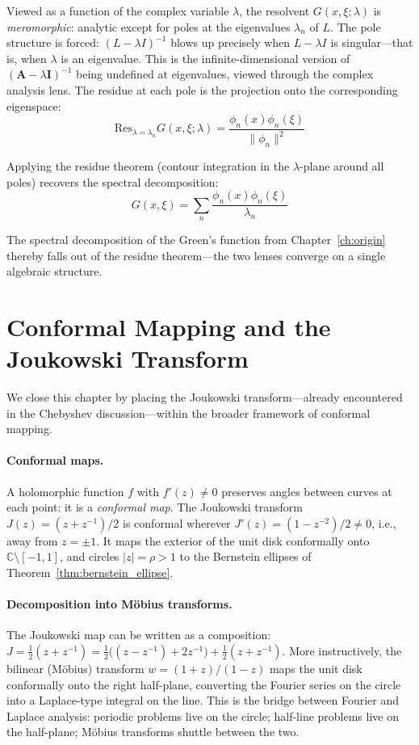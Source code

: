 \documentclass[12pt,a4paper]{report}
\theoremstyle{thms}
\theoremstyle{defns}
\begin{document}
Viewed as a function of the complex variable $\lambda$, the resolvent $G(x, \xi; \lambda)$ is \textit{meromorphic}: analytic except for poles at the eigenvalues $\lambda_n$ of $L$. The pole structure is forced: $(L - \lambda I)^{-1}$ blows up precisely when $L - \lambda I$ is singular—that is, when $\lambda$ is an eigenvalue. This is the infinite-dimensional version of $(\mathbf{A} - \lambda \mathbf{I})^{-1}$ being undefined at eigenvalues, viewed through the complex analysis lens. The residue at each pole is the projection onto the corresponding eigenspace:
\begin{equation}
    \mathrm{Res}_{\lambda = \lambda_n} G(x, \xi; \lambda) = \dfrac{\phi_n(x)\phi_n(\xi)}{\|\phi_n\|^2}
\end{equation}

Applying the residue theorem (contour integration in the $\lambda$-plane around all poles) recovers the spectral decomposition:
\begin{equation}
    G(x, \xi) = \sum_n \dfrac{\phi_n(x)\phi_n(\xi)}{\lambda_n}
\end{equation}

The spectral decomposition of the Green's function from Chapter~\ref{ch:origin} thereby falls out of the residue theorem—the two lenses converge on a single algebraic structure.

\section{Conformal Mapping and the Joukowski Transform}
\label{sec:conformal}

We close this chapter by placing the Joukowski transform—already encountered in the Chebyshev discussion—within the broader framework of conformal mapping.

\paragraph{Conformal maps.} A holomorphic function $f$ with $f'(z) \neq 0$ preserves angles between curves at each point: it is a \textit{conformal map}. The Joukowski transform $J(z) = (z + z^{-1})/2$ is conformal wherever $J'(z) = (1 - z^{-2})/2 \neq 0$, i.e., away from $z = \pm 1$. It maps the exterior of the unit disk conformally onto $\mathbb{C} \setminus [-1, 1]$, and circles $|z| = \rho > 1$ to the Bernstein ellipses of Theorem~\ref{thm:bernstein_ellipse}.

\paragraph{Decomposition into M\"{o}bius transforms.} The Joukowski map can be written as a composition: $J = \frac{1}{2}(z + z^{-1}) = \frac{1}{2}\bigl((z - z^{-1}) + 2z^{-1}\bigr) + \frac{1}{2}(z + z^{-1})$. More instructively, the bilinear (M\"{o}bius) transform $w = (1 + z)/(1 - z)$ maps the unit disk conformally onto the right half-plane, converting the Fourier series on the circle into a Laplace-type integral on the line. This is the bridge between Fourier and Laplace analysis: periodic problems live on the circle; half-line problems live on the half-plane; M\"{o}bius transforms shuttle between the two.
\end{document}
